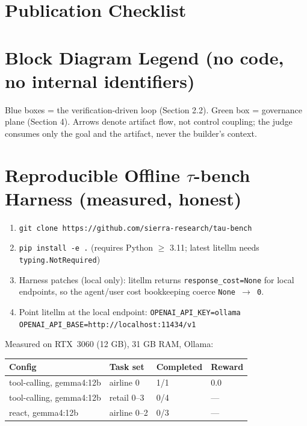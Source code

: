 \documentclass[11pt]{article}
\begin{document}
\begin{appendix}
\section{Publication Checklist}

\section{Block Diagram Legend (no code, no internal identifiers)}
Blue boxes = the verification-driven loop (Section 2.2). Green box = governance plane
(Section 4). Arrows denote artifact flow, not control coupling; the judge consumes only
the goal and the artifact, never the builder's context.

\section{Reproducible Offline \texorpdfstring{$\tau$}{tau}-bench Harness (measured, honest)}
\begin{enumerate}
  \item \texttt{git clone https://github.com/sierra-research/tau-bench}
  \item \texttt{pip install -e .} (requires Python $\ge$ 3.11; latest litellm needs
        \texttt{typing.NotRequired})
  \item Harness patches (local only): litellm returns \texttt{response\_cost=None} for
        local endpoints, so the agent/user cost bookkeeping coerce \texttt{None
        $\rightarrow$ 0}.
  \item Point litellm at the local endpoint:
        \texttt{OPENAI\_API\_KEY=ollama}\\[-2pt]
        \texttt{OPENAI\_API\_BASE=http://localhost:11434/v1}
\end{enumerate}
Measured on RTX~3060 (12 GB), 31 GB RAM, Ollama:
\begin{center}
\begin{tabular}{@{}llll@{}}
\toprule
Config & Task set & Completed & Reward\\
\midrule
tool-calling, gemma4:12b & airline 0 & 1/1 & 0.0\\
tool-calling, gemma4:12b & retail 0--3 & 0/4 & ---\\
react, gemma4:12b & airline 0--2 & 0/3 & ---\\
\bottomrule
\end{tabular}
\end{center}


\end{appendix}
\end{document}
